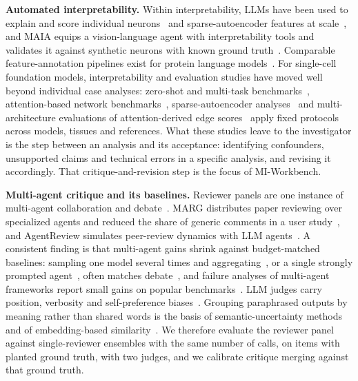 \documentclass[10pt,letterpaper]{article}
\begin{document}
\noindent\textbf{Automated interpretability.} Within interpretability, LLMs have been used to explain and score individual neurons~\cite{bills2023language} and sparse-autoencoder features at scale~\cite{paulo2025autointerp}, and MAIA equips a vision-language agent with interpretability tools and validates it against synthetic neurons with known ground truth~\cite{shaham2024maia}. Comparable feature-annotation pipelines exist for protein language models~\cite{simon2025interplm,gujral2025sae}. For single-cell foundation models, interpretability and evaluation studies have moved well beyond individual case analyses: zero-shot and multi-task benchmarks~\cite{kedzierska2025zeroshot,boiarsky2023deepdive,liu2026sceval}, attention-based network benchmarks~\cite{kalfon2025scprint,ye2026grnbenchmark}, sparse-autoencoder analyses~\cite{pedrocchi2025sae} and multi-architecture evaluations of attention-derived edge scores~\cite{kendiukhov2026attention} apply fixed protocols across models, tissues and references. What these studies leave to the investigator is the step between an analysis and its acceptance: identifying confounders, unsupported claims and technical errors in a specific analysis, and revising it accordingly. That critique-and-revision step is the focus of MI-Workbench.

\noindent\textbf{Multi-agent critique and its baselines.} Reviewer panels are one instance of multi-agent collaboration and debate~\cite{li2023camel,wu2023autogen,qian2024chatdev,hong2023metagpt,du2024debate}. MARG distributes paper reviewing over specialized agents and reduced the share of generic comments in a user study~\cite{darcy2024marg}, and AgentReview simulates peer-review dynamics with LLM agents~\cite{jin2024agentreview}. A consistent finding is that multi-agent gains shrink against budget-matched baselines: sampling one model several times and aggregating~\cite{wang2023selfconsistency,li2024moreagents}, or a single strongly prompted agent~\cite{wang2024rethinking}, often matches debate~\cite{smit2024mad}, and failure analyses of multi-agent frameworks report small gains on popular benchmarks~\cite{cemri2025mast}. LLM judges carry position, verbosity and self-preference biases~\cite{zheng2023judging,wang2024fair}. Grouping paraphrased outputs by meaning rather than shared words is the basis of semantic-uncertainty methods~\cite{kuhn2023semantic,farquhar2024semantic} and of embedding-based similarity~\cite{reimers2019sbert}. We therefore evaluate the reviewer panel against single-reviewer ensembles with the same number of calls, on items with planted ground truth, with two judges, and we calibrate critique merging against that ground truth.
\end{document}
